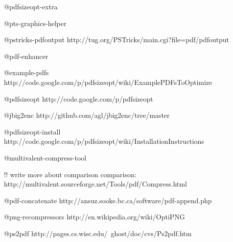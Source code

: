 \documentclass{ltugproc}
\begin{document}
@pdfsizeopt-extra{
}

@pts-graphics-helper{
}

@pstricks-pdfoutput{
http://tug.org/PSTricks/main.cgi?file=pdf/pdfoutput
}

@pdf-enhancer{
}

@example-pdfs{
http://code.google.com/p/pdfsizeopt/wiki/ExamplePDFsToOptimize
}

@pdfsizeopt{
http://code.google.com/p/pdfsizeopt
}

@jbig2enc{
http://github.com/agl/jbig2enc/tree/master
}

@pdfsizeopt-install{
http://code.google.com/p/pdfsizeopt/wiki/InstallationInstructions
}

@multivalent-compress-tool{
!! write more about comparison
comparison: http://multivalent.sourceforge.net/Tools/pdf/Compress.html

}

@pdf-concatenate{
http://ansuz.sooke.bc.ca/software/pdf-append.php
}

@png-recompressors{
http://en.wikipedia.org/wiki/OptiPNG
}

@ps2pdf{
http://pages.cs.wisc.edu/~ghost/doc/cvs/Ps2pdf.htm
}
\end{document}
